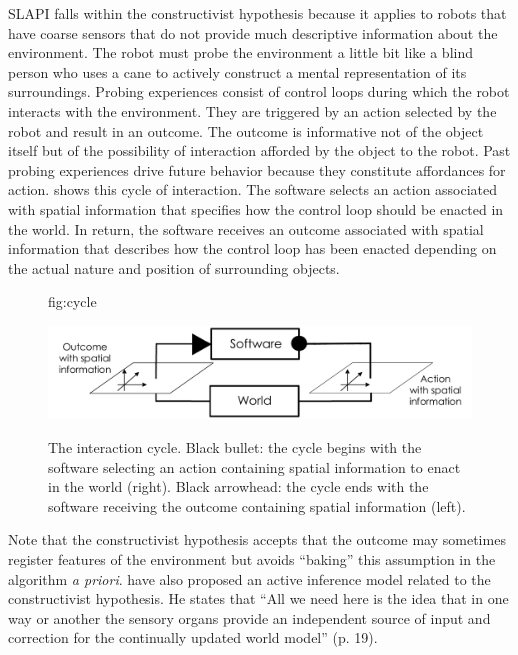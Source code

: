 \documentclass[pmlr]{jmlr}%
\begin{document}
SLAPI falls within the constructivist hypothesis because it applies to robots that have coarse sensors that do not provide much descriptive information about the environment. 
The robot must probe the environment a little bit like a blind person who uses a cane to actively construct a mental representation of its surroundings. 
Probing experiences consist of control loops during which the robot interacts with the environment.   
They are triggered by an action selected by the robot and result in an outcome. 
The outcome is informative not of the object itself but of the possibility of interaction afforded by the object to the robot. 
Past probing experiences drive future behavior because they constitute affordances for action. 
 shows this cycle of interaction. 
The software selects an action associated with spatial information that specifies how the control loop should be enacted in the world. 
In return, the software receives an outcome associated with spatial information that describes how the control loop has been enacted depending on the actual nature and position of surrounding objects. 


\begin{figure}[htbp]
	\floatconts
	{fig:cycle}
	{\caption{The interaction cycle. Black bullet: the cycle begins with the software selecting an action containing spatial information to enact in the world (right). Black arrowhead: the cycle ends with the software receiving the outcome containing spatial information (left).}}
	{\includegraphics[width=0.8\linewidth]{images/Figure_0_Cycle}}
\end{figure}

Note that the constructivist hypothesis accepts that the outcome may sometimes register features of the environment but avoids ``baking'' this assumption in the algorithm \textit{a priori}. 
\cite{rudrauf_mathematical_2017} have also proposed an active inference model related to the constructivist hypothesis. He states that ``All we need here is the idea that in one way or another the sensory organs provide an independent source of input and correction for the continually updated world model'' (p. 19).
\end{document}
